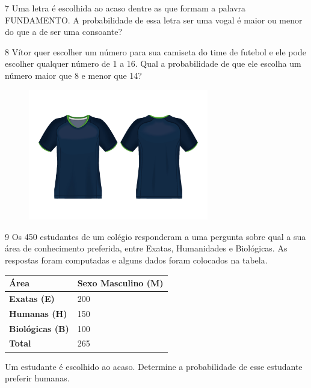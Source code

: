 \num{7} Uma letra é escolhida ao acaso dentre as que formam a palavra
FUNDAMENTO. A probabilidade de essa letra ser uma vogal é maior ou menor do que a de ser uma consoante?

\num{8} Vítor quer escolher um número para sua camiseta do time de futebol e ele
pode escolher qualquer número de 1 a 16. Qual a probabilidade de que ele
escolha um número maior que 8 e menor que 14?

\begin{figure}[htpb!]
\centering
\includegraphics[width=0.7\textwidth]{./media/image75d.png}
\end{figure}


\num{9} Os 450 estudantes de um colégio responderam a uma pergunta sobre qual a
sua área de conhecimento preferida, entre Exatas, Humanidades e
Biológicas. As respostas foram computadas e alguns dados foram colocados
na tabela.

\vspace{2ex}

\begin{longtable}[]{@{}ll@{}}
\toprule
\hline
\textbf{Área} & \textbf{Sexo Masculino (M)}\tabularnewline
\hline
\textbf{Exatas (E)} & 200\tabularnewline
\hline
\textbf{Humanas (H)} & 150\tabularnewline
\hline
\textbf{Biológicas (B)} & 100\tabularnewline
\hline
\textbf{Total} & 265\tabularnewline
\hline
\bottomrule
\end{longtable}

\pagebreak
Um estudante é escolhido ao acaso. Determine a probabilidade de esse
estudante preferir humanas.


